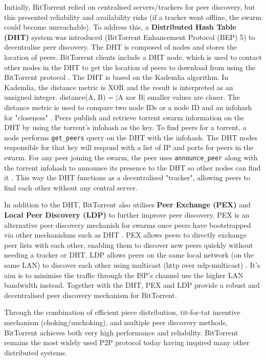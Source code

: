 \documentclass[12pt,a4paper]{report}
\begin{document}
Initially, BitTorrent relied on centralised servers/trackers for peer discovery, but this presented reliability and availability risks (if a tracker went offline, the swarm could become unreachable). To address this, a \textbf{Distributed Hash Table (DHT)} system was introduced (BitTorrent Enhancement Protocol (BEP) 5) to decentralise peer discovery. The DHT is composed of nodes and stores the location of peers. BitTorrent clients include a DHT node, which is used to contact other nodes in the DHT to get the location of peers to download from using the BitTorrent protocol \cite{bep_0005}. The DHT is based on the Kademlia algorithm. In Kademlia, the distance metric is XOR and the result is interpreted as an unsigned integer. distance(A, B) = $|\text{A xor B}|$ smaller values are closer. The distance metric is used to compare two node IDs or a node ID and an infohash for "closeness" \cite{bep_0005}. Peers publish and retrieve torrent swarm information on the DHT by using the torrent's infohash as the key. To find peers for a torrent, a node performs \texttt{get\_peers} query on the DHT with the infohash. The DHT nodes responsible for that key will respond with a list of IP and ports for peers in the swarm. For any peer joining the swarm, the peer uses \texttt{announce\_peer} along with the torrent infohash to announce its presence to the DHT so other nodes can find it \cite{bep_0005}. This way the DHT functions as a decentralised "tracker", allowing peers to find each other without any central server.

In addition to the DHT, BitTorrent also utilises \textbf{Peer Exchange (PEX)} and \textbf{Local Peer Discovery (LDP)} to further improve peer discovery. PEX is an alternative peer discovery mechanish for swarms once peers have bootstrapped via other mechanishms such as DHT \cite{bep_0011}. PEX allows peers to directly exchange peer lists with each other, enabling them to discover new peers quickly without needing a tracker or DHT. LDP allows peers on the same local network (on the same LAN) to discover each other using multicast (http over udp-multicast) \cite{bep_0014}. It's aim is to minimise the traffic through the ISP's channel use the higher LAN bandwidth instead. Together with the DHT, PEX and LDP provide a robust and decentralised peer discovery mechanism for BitTorrent.

Through the combination of efficient piece distribution, tit-for-tat incentive mechanism (choking/unchoking), and multiple peer discovery methods, BitTorrent achieves both very high performance and reliability. BitTorrent remains the most widely used P2P protocol today having inspired many other distributed systems.
\end{document}

